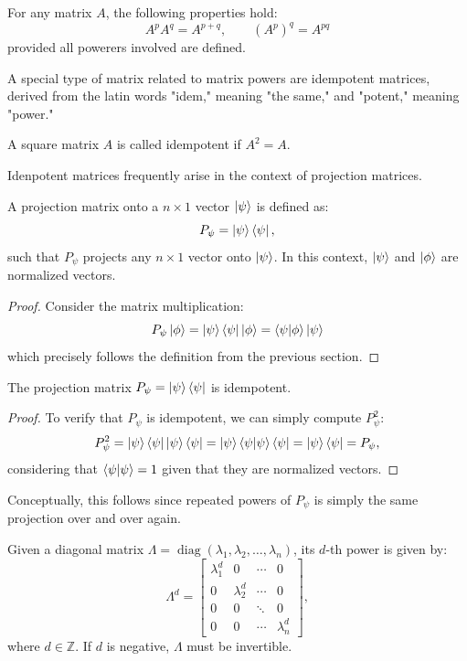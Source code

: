 \documentclass[12pt]{article}
\begin{document}
\begin{theorem}
    For any matrix $A$, the following properties hold:
    $$A^p A^q = A^{p+q}, \qquad (A^p)^q = A^{pq}$$
    provided all powerers involved are defined. 
\end{theorem}

A special type of matrix related to matrix powers are idempotent matrices, derived from the latin words "idem," meaning "the same," and "potent," meaning "power."

\begin{definition}
    A square matrix $A$ is called idempotent if $A^2 = A$.
\end{definition}

Idenpotent matrices frequently arise in the context of projection matrices. 

\begin{definition}
    A projection matrix onto a $n \times 1$ vector $\ket{\psi}$ is defined as:
    $$P_{\psi} = \ket{\psi} \bra{\psi},$$
    such that $P_{\psi}$ projects any $n \times 1$ vector onto $\ket{\psi}$. In this context, $\ket{\psi}$ and $\ket{\phi}$ are normalized vectors. 
\end{definition}

\begin{proof}
    Consider the matrix multiplication:
    $$P_{\psi} \ketphi = \ketpsi \brapsi \ketphi = \braket{\psi}{\phi} \ketpsi$$
    which precisely follows the definition from the previous section. 
\end{proof}

\begin{theorem}
    The projection matrix $P_{\psi} = \ket{\psi} \bra{\psi}$ is idempotent. 
\end{theorem}

\begin{proof}
    To verify that $P_{\psi}$ is idempotent, we can simply compute $P_{\psi}^2$:
    $$P_{\psi}^2 = \ketpsi \brapsi \ketpsi \brapsi = \ketpsi \braket{\psi}{\psi} \brapsi = \ketpsi \brapsi = P_{\psi},$$
    considering that $\braket{\psi}{\psi} = 1$ given that they are normalized vectors. 
\end{proof}

Conceptually, this follows since repeated powers of $P_\psi$ is simply the same projection over and over again. 

\begin{theorem}
    Given a diagonal matrix $\Lambda = \operatorname{diag}(\lambda_{1}, \lambda_{2}, \ldots, \lambda_{n})$, its $d$-th power is given by:
    \[
        \Lambda^{d} =
        \begin{bmatrix}
        \lambda_{1}^{d} & 0 & \cdots & 0 \\
        0 & \lambda_{2}^{d} & \cdots & 0 \\
        0 & 0 & \ddots & 0 \\
        0 & 0 & \cdots & \lambda_{n}^{d}
        \end{bmatrix},
    \]
    where $d \in \mathbb{Z}$. If $d$ is negative, $\Lambda$ must be invertible.
\end{theorem}
\end{document}
